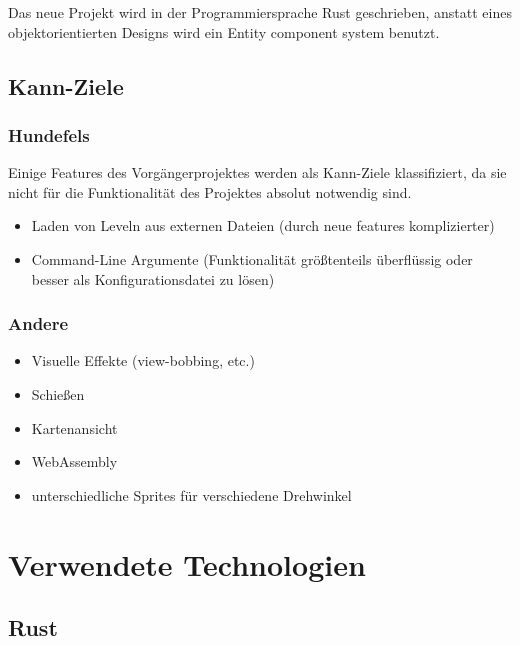 \documentclass[a4paper,titlepage]{article}
\begin{document}
    Das neue Projekt wird in der Programmiersprache Rust geschrieben,
    anstatt eines objektorientierten Designs wird ein Entity component system benutzt.
    
    \subsection{Kann-Ziele}
    
    \subsubsection*{Hundefels}
    
    Einige Features des Vorgängerprojektes werden als Kann-Ziele klassifiziert, da sie nicht für die Funktionalität des Projektes absolut notwendig sind.
    
    \begin{itemize}
        \item Laden von Leveln aus externen Dateien (durch neue features komplizierter)
        \item Command-Line Argumente (Funktionalität größtenteils überflüssig oder besser als Konfigurationsdatei zu lösen)
    \end{itemize}
    
    \subsubsection*{Andere}
    
    \begin{itemize}
        \item Visuelle Effekte (view-bobbing, etc.)
        \item Schießen
        \item Kartenansicht
        \item WebAssembly
        \item unterschiedliche Sprites für verschiedene Drehwinkel
    \end{itemize}
    
    
    \newpage
    
    \section{Verwendete Technologien}
    
    \subsection{Rust}
    
\end{document}
